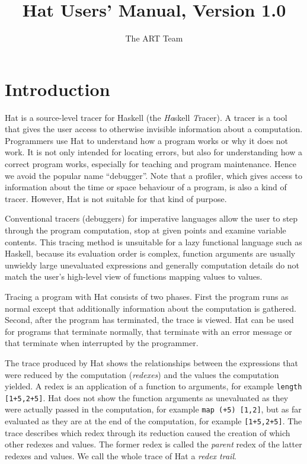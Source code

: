 \documentclass[12pt]{article}
\begin{document}
\title{Hat Users' Manual, Version 1.0}
\author{The ART Team}
\date{}
\maketitle
\vspace{-8ex}

\thispagestyle{empty}

\tableofcontents


\section{Introduction}\label{introduction}

Hat is a source-level tracer for Haskell (the \emph{Ha}skell \emph{T}racer). A tracer is a tool that gives the user access to otherwise invisible information about a computation. Programmers use Hat to understand how a program works or why it does not work. It is not only intended for locating errors, but also for understanding how a correct program works, especially for teaching and program maintenance. Hence we avoid the popular name ``debugger''. Note that a profiler, which gives access to information about the time or space behaviour of a program, is also a kind of tracer. However, Hat is not suitable for that kind of purpose.

Conventional tracers (debuggers) for imperative languages allow the user to step through the program computation, stop at given points and examine variable contents.
This tracing method is unsuitable for a lazy functional language such as Haskell, because its evaluation order is complex, function arguments are usually unwieldy large unevaluated expressions and generally computation details do not match the user's high-level view of functions mapping values to values.

Tracing a program with Hat consists of two phases. First the program runs as normal except that additionally information about the computation is gathered. Second, after the program has terminated, the trace is viewed. 
Hat can be used for programs that terminate normally, that terminate with an error message or that terminate when interrupted by the programmer.

The trace produced by Hat shows the relationships between the expressions that were reduced by the computation (\emph{redexes}) and the values the computation yielded. A redex is an application of a function to arguments, for example \texttt{length [1+5,2+5]}. Hat does not show the function arguments as unevaluated as they were actually passed in the computation, for example \texttt{map (+5) [1,2]}, but as far evaluated as they are at the end of the computation, for example \texttt{[1+5,2+5]}. The trace describes which redex through its reduction caused the creation of which other redexes and values. The former redex is called the \emph{parent} redex of the latter redexes and values. We call the whole trace of Hat a \emph{redex trail}.
\end{document}
